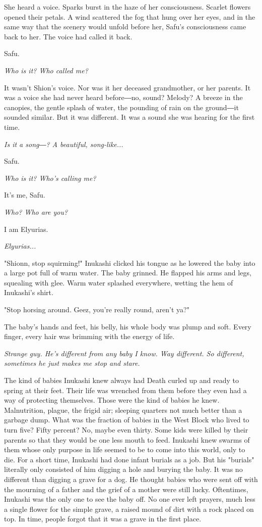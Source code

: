 She heard a voice. Sparks burst in the haze of her consciousness.
Scarlet flowers opened their petals. A wind scattered the fog that hung
over her eyes, and in the same way that the scenery would unfold before
her, Safu's consciousness came back to her. The voice had called it
back.

Safu.

\emph{Who is it? Who called me?}

It wasn't Shion's voice. Nor was it her deceased grandmother, or her
parents. It was a voice she had never heard before―no, sound? Melody? A
breeze in the canopies, the gentle splash of water, the pounding of rain
on the ground―it sounded similar. But it was different. It was a sound
she was hearing for the first time.

\emph{Is it a song―? A beautiful, song-like...}

Safu.

\emph{Who is it? Who's calling me?}

It's me, Safu.

\emph{Who? Who are you?}

I am Elyurias.

\emph{Elyurias...}

\mybreak

"Shionn, stop squirming!" Inukashi clicked his tongue as he lowered the
baby into a large pot full of warm water. The baby grinned. He flapped
his arms and legs, squealing with glee. Warm water splashed everywhere,
wetting the hem of Inukashi's shirt.

"Stop horsing around. Geez, you're really round, aren't ya?"

The baby's hands and feet, his belly, his whole body was plump and soft.
Every finger, every hair was brimming with the energy of life.

\emph{Strange guy. He's different from any baby I know. Way different. So
	different, sometimes he just makes me stop and stare.}

The kind of babies Inukashi knew always had Death curled up and ready to
spring at their feet. Their life was wrenched from them before they even
had a way of protecting themselves. Those were the kind of babies he
knew. Malnutrition, plague, the frigid air; sleeping quarters not much
better than a garbage dump. What was the fraction of babies in the West
Block who lived to turn five? Fifty percent? No, maybe even thirty. Some
kids were killed by their parents so that they would be one less mouth
to feed. Inukashi knew swarms of them whose only purpose in life seemed
to be to come into this world, only to die. For a short time, Inukashi
had done infant burials as a job. But his "burials" literally only
consisted of him digging a hole and burying the baby. It was no
different than digging a grave for a dog. He thought babies who were
sent off with the mourning of a father and the grief of a mother were
still lucky. Oftentimes, Inukashi was the only one to see the baby off.
No one ever left prayers, much less a single flower for the simple
grave, a raised mound of dirt with a rock placed on top. In time, people
forgot that it was a grave in the first place.

